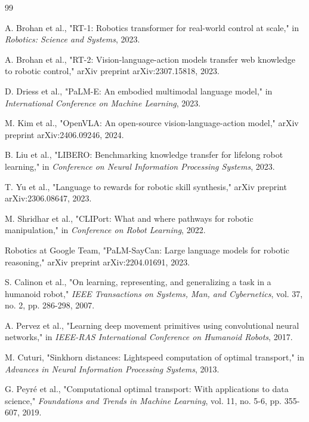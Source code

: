 \documentclass[10pt,twocolumn]{article}
\begin{document}
\begin{thebibliography}{99}

A. Brohan et al., "RT-1: Robotics transformer for real-world control at scale," in \emph{Robotics: Science and Systems}, 2023.

A. Brohan et al., "RT-2: Vision-language-action models transfer web knowledge to robotic control," arXiv preprint arXiv:2307.15818, 2023.

D. Driess et al., "PaLM-E: An embodied multimodal language model," in \emph{International Conference on Machine Learning}, 2023.

M. Kim et al., "OpenVLA: An open-source vision-language-action model," arXiv preprint arXiv:2406.09246, 2024.

B. Liu et al., "LIBERO: Benchmarking knowledge transfer for lifelong robot learning," in \emph{Conference on Neural Information Processing Systems}, 2023.

T. Yu et al., "Language to rewards for robotic skill synthesis," arXiv preprint arXiv:2306.08647, 2023.

M. Shridhar et al., "CLIPort: What and where pathways for robotic manipulation," in \emph{Conference on Robot Learning}, 2022.

Robotics at Google Team, "PaLM-SayCan: Large language models for robotic reasoning," arXiv preprint arXiv:2204.01691, 2023.

S. Calinon et al., "On learning, representing, and generalizing a task in a humanoid robot," \emph{IEEE Transactions on Systems, Man, and Cybernetics}, vol. 37, no. 2, pp. 286-298, 2007.

A. Pervez et al., "Learning deep movement primitives using convolutional neural networks," in \emph{IEEE-RAS International Conference on Humanoid Robots}, 2017.

M. Cuturi, "Sinkhorn distances: Lightspeed computation of optimal transport," in \emph{Advances in Neural Information Processing Systems}, 2013.

G. Peyré et al., "Computational optimal transport: With applications to data science," \emph{Foundations and Trends in Machine Learning}, vol. 11, no. 5-6, pp. 355-607, 2019.


\end{thebibliography}
\end{document}
